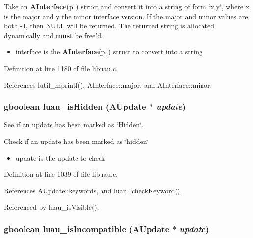 Take an {\bf AInterface}{\rm (p.\,\pageref{structAInterface})} struct and convert it into a string of form \char`\"{}x.y\char`\"{}, where x is the major and y the minor interface version. If the major and minor values are both -1, then NULL will be returned. The returned string is allocated dynamically and {\bf must} be free'd.

\begin{itemize}
\item interface is the {\bf AInterface}{\rm (p.\,\pageref{structAInterface})} struct to convert into a string 
\end{itemize}


Definition at line 1180 of file libuau.c.

References lutil\_\-mprintf(), AInterface::major, and AInterface::minor.
\subsubsection{\setlength{\rightskip}{0pt plus 5cm}gboolean luau\_\-is\-Hidden ({\bf AUpdate} $\ast$ {\em update})}\label{libuau_8c_a35}


See if an update has been marked as \char`\"{}Hidden\char`\"{}. 

Check if an update has been marked as \char`\"{}hidden\char`\"{}

\begin{itemize}
\item update is the update to check 
\end{itemize}


Definition at line 1039 of file libuau.c.

References AUpdate::keywords, and luau\_\-check\-Keyword().

Referenced by luau\_\-is\-Visible().
\subsubsection{\setlength{\rightskip}{0pt plus 5cm}gboolean luau\_\-is\-Incompatible ({\bf AUpdate} $\ast$ {\em update})}\label{libuau_8c_a34}


